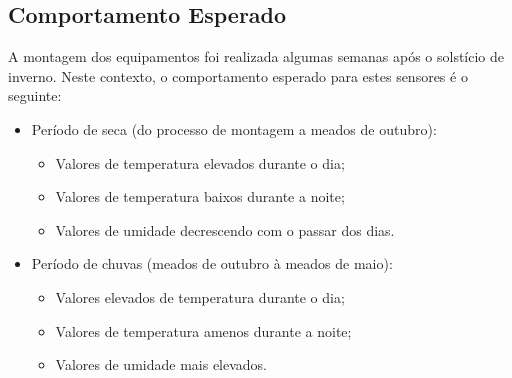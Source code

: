 \subsection{Comportamento Esperado}
\quad A montagem dos equipamentos foi realizada algumas semanas após o solstício de inverno. Neste contexto, o comportamento esperado para estes sensores é o seguinte:
\begin{itemize}
  \item Período de seca (do processo de montagem a meados de outubro):
  \begin{itemize}
    \item Valores de temperatura elevados durante o dia;
    \item Valores de temperatura baixos durante a noite;
    \item Valores de umidade decrescendo com o passar dos dias.
  \end{itemize}
  \item Período de chuvas (meados de outubro à meados de maio):
  \begin{itemize}
    \item Valores elevados de temperatura durante o dia;
    \item Valores de temperatura amenos durante a noite;
    \item Valores de umidade mais elevados.
  \end{itemize}
\end{itemize}


